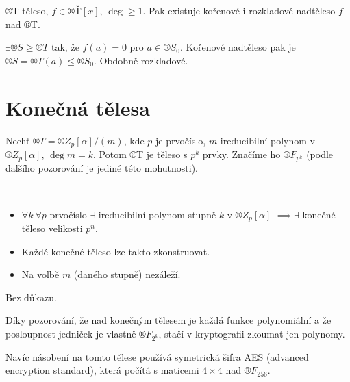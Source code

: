 \documentclass[12pt]{article}                   %
\begin{document}
        \begin{dusledek}
            ®T těleso, $f \in ®Ť[x]$, $\deg ≥ 1$. Pak existuje kořenové i rozkladové nadtěleso $f$ nad ®T.

            \begin{dukazin}
                $\exists ®S ≥ ®T$ tak, že $f(a) = 0$ pro $a \in ®S_0$. Kořenové nadtěleso pak je $®S = ®T(a) ≤ ®S_0$. Obdobně rozkladové.
            \end{dukazin}
        \end{dusledek}


\section{Konečná tělesa}
    \begin{pozorovani}
        Nechť $®T = ®Z_p[\alpha]/(m)$, kde $p$ je prvočíslo, $m$ ireducibilní polynom v $®Z_p[\alpha]$, $\deg m = k$. Potom ®T je těleso s $p^k$ prvky. Značíme ho $®F_{p^k}$ (podle dalšího pozorování je jediné této mohutnosti).
    \end{pozorovani}

    \begin{pozorovani}
        \ 
        \begin{itemize}
            \item $\forall k\ \forall p$ prvočíslo $\exists$ ireducibilní polynom stupně $k$ v $®Z_p[\alpha]$ $\implies \exists$ konečné těleso velikosti $p^n$.
            \item Každé konečné těleso lze takto zkonstruovat.
            \item Na volbě $m$ (daného stupně) nezáleží.
        \end{itemize}

        \begin{dukazin}
            Bez důkazu.
        \end{dukazin}
    \end{pozorovani}

    \begin{poznamka}
        Díky pozorování, že nad konečným tělesem je každá funkce polynomiální a že posloupnost jedniček je vlastně $®F_{2^k}$, stačí v kryptografii zkoumat jen polynomy.

        Navíc násobení na tomto tělese používá symetrická šifra AES (advanced encryption standard), která počítá s maticemi $4 \times 4$ nad $®F_{256}$.
    \end{poznamka}
\end{document}
